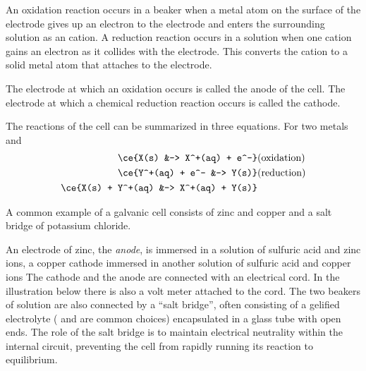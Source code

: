 \documentclass[../mit-general-chemistry.tex]{subfiles}
\begin{document}
An oxidation reaction occurs in a beaker when a metal atom on the
surface of the electrode gives up an electron to the electrode and
enters the surrounding solution as an cation. A reduction reaction
occurs in a solution when one cation gains an electron as it collides
with the electrode. This converts the cation to a solid metal atom
that attaches to the electrode.

The electrode at which an oxidation occurs is called the anode of the
cell. The electrode at which a chemical reduction reaction occurs is
called the cathode.

The reactions of the cell can be summarized in three equations. For
two metals   and 
\begin{align*}
  \ce{X(s) &-> X^+(aq) + e^-}&\text{(oxidation)}\\
  \ce{Y^+(aq) + e^- &-> Y(s)}&\text{(reduction)}\\
  \ce{X(s) + Y^+(aq) &-> X^+(aq) + Y(s)}\\
\end{align*}


A common example of a galvanic cell consists of zinc and copper and a
salt bridge of potassium chloride.

An electrode of zinc, the {\em anode}, is immersed in a solution of
sulfuric acid and zinc ions, a copper cathode immersed in another
solution of sulfuric acid and copper ions The cathode and the anode
are connected with an electrical cord. In the illustration below there
is also a volt meter attached to the cord. The two beakers of solution
are also connected by a ``salt bridge'', often consisting of a
gelified electrolyte ( and  are common choices)
encapsulated in a glass tube with open ends. The role of the salt
bridge is to maintain electrical neutrality within the internal
circuit, preventing the cell from rapidly running its reaction to
equilibrium.
\end{document}
